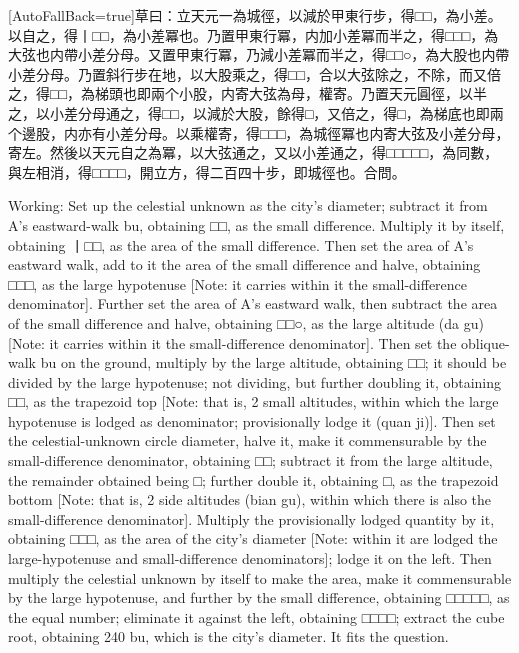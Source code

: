 \documentclass[11pt]{article}
\newcommand{\zhsmall}{\footnotesize\color{black!70}}
\newcommand{\unitlabel}[1]{\marginpar{\raggedleft\tiny\color{gray}#1}}
\newenvironment{unitzh}{\par\CJKfontspec{Noto Serif CJK SC}[AutoFallBack=true]\large\linespread{1.25}\selectfont}{\par}
\newenvironment{uniten}{\par\small\color{black!85}}{\par\medskip}
\begin{document}
\begin{unitzh}\unitlabel{ceyuan-018.11}草曰：立天元一為城徑，以減於甲東行步，得□□，為小差。以自之，得丨□□，為小差冪也。乃置甲東行冪，内加小差冪而半之，得□□□，為大弦也{\zhsmall 内帶小差分母}。又置甲東行冪，乃減小差冪而半之，得□□○，為大股也{\zhsmall 内帶小差分母}。乃置斜行步在地，以大股乘之，得□□，合以大弦除之，不除，而又倍之，得□□，為梯頭也{\zhsmall 即兩个小股，内寄大弦為母，權寄}。乃置天元圓徑，以半之，以小差分母通之，得□□，以減於大股，餘得□，又倍之，得□，為梯底也{\zhsmall 即兩个邊股，内亦有小差分母}。以乘權寄，得□□□，為城徑冪也{\zhsmall 内寄大弦及小差分母}，寄左。然後以天元自之為冪，以大弦通之，又以小差通之，得□□□□□，為同數，與左相消，得□□□□，開立方，得二百四十步，即城徑也。合問。\end{unitzh}
\begin{uniten}Working: Set up the celestial unknown as the city's diameter; subtract it from A's eastward-walk bu, obtaining □□, as the small difference. Multiply it by itself, obtaining 丨□□, as the area of the small difference. Then set the area of A's eastward walk, add to it the area of the small difference and halve, obtaining □□□, as the large hypotenuse [Note: it carries within it the small-difference denominator]. Further set the area of A's eastward walk, then subtract the area of the small difference and halve, obtaining □□○, as the large altitude (da gu) [Note: it carries within it the small-difference denominator]. Then set the oblique-walk bu on the ground, multiply by the large altitude, obtaining □□; it should be divided by the large hypotenuse; not dividing, but further doubling it, obtaining □□, as the trapezoid top [Note: that is, 2 small altitudes, within which the large hypotenuse is lodged as denominator; provisionally lodge it (quan ji)]. Then set the celestial-unknown circle diameter, halve it, make it commensurable by the small-difference denominator, obtaining □□; subtract it from the large altitude, the remainder obtained being □; further double it, obtaining □, as the trapezoid bottom [Note: that is, 2 side altitudes (bian gu), within which there is also the small-difference denominator]. Multiply the provisionally lodged quantity by it, obtaining □□□, as the area of the city's diameter [Note: within it are lodged the large-hypotenuse and small-difference denominators]; lodge it on the left. Then multiply the celestial unknown by itself to make the area, make it commensurable by the large hypotenuse, and further by the small difference, obtaining □□□□□, as the equal number; eliminate it against the left, obtaining □□□□; extract the cube root, obtaining 240 bu, which is the city's diameter. It fits the question.\end{uniten}
\end{document}
